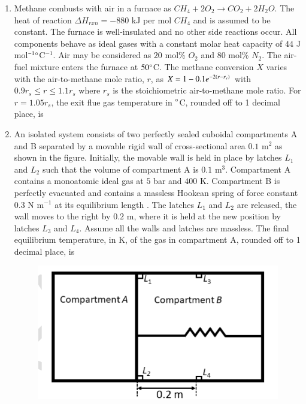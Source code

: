 \documentclass[journal,12pt,onecolumn]{IEEEtran}
\theoremstyle{remark}
\begin{document}
\begin{enumerate}
	\hfill{}
	
	\item Methane combusts with air in a furnace as $CH_4 + 2O_2 \to CO_2 + 2H_2O$. The heat of reaction $\Delta H_{rxn} = -880$ kJ per mol $CH_4$ and is assumed to be constant. The furnace is well-insulated and no other side reactions occur. All components behave as ideal gases with a constant molar heat capacity of $44$ J mol$^{-1}\degree$C$^{-1}$. Air may be considered as $20$ mol\% $O_2$ and $80$ mol\% $N_2$. The air-fuel mixture enters the furnace at $50\degree$C. The methane conversion $X$ varies with the air-to-methane mole ratio, $r$, as $X = 1 - 0.1 e^{-2\left(r-r_s\right)}$ with $0.9 r_s \le r \le 1.1 r_s$ where $r_s$ is the stoichiometric air-to-methane mole ratio. For $r = 1.05 r_s$, the exit flue gas temperature in $\degree$C, rounded off to 1 decimal place, is \underline{\hspace{2cm}}
	
	\hfill{}
	
	\item An isolated system consists of two perfectly sealed cuboidal compartments A and B separated by a movable rigid wall of cross-sectional area $0.1$ m$^2$ as shown in the figure. Initially, the movable wall is held in place by latches $L_1$ and $L_2$ such that the volume of compartment A is $0.1$ m$^3$. Compartment A contains a monoatomic ideal gas at $5$ bar and $400$ K. Compartment B is perfectly evacuated and contains a massless Hookean spring of force constant $0.3$ N m$^{-1}$ at its equilibrium length . The latches $L_1$ and $L_2$ are released, the wall moves to the right by $0.2$ m, where it is held at the new position by latches $L_3$ and $L_4$. Assume all the walls and latches are massless. The final equilibrium temperature, in K, of the gas in compartment A, rounded off to 1 decimal place, is \underline{\hspace{2cm}}
	\begin{figure}
		\includegraphics[width = 0.6\columnwidth]{q56}
		\caption*{}
		\label{fig:q56}
	\end{figure}
	

\end{enumerate}
\end{document}
